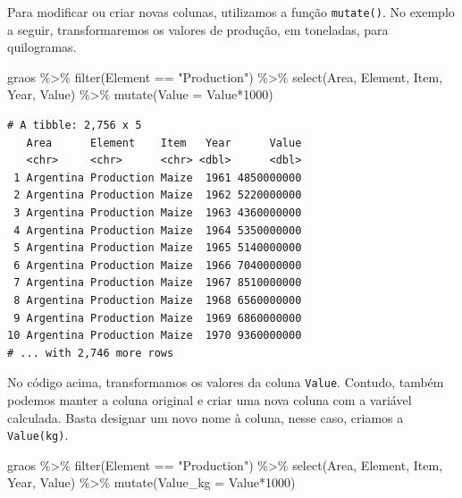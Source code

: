 \documentclass[
  brazilian,
]{book}
\newenvironment{Shaded}{\begin{snugshade}}{\end{snugshade}}
\newcommand{\AttributeTok}[1]{\textcolor[rgb]{0.77,0.63,0.00}{#1}}
\newcommand{\DecValTok}[1]{\textcolor[rgb]{0.00,0.00,0.81}{#1}}
\newcommand{\FunctionTok}[1]{\textcolor[rgb]{0.00,0.00,0.00}{#1}}
\newcommand{\NormalTok}[1]{#1}
\newcommand{\SpecialCharTok}[1]{\textcolor[rgb]{0.00,0.00,0.00}{#1}}
\newcommand{\StringTok}[1]{\textcolor[rgb]{0.31,0.60,0.02}{#1}}
\begin{document}
Para modificar ou criar novas colunas, utilizamos a função \texttt{mutate()}. No exemplo a seguir, transformaremos os valores de produção, em toneladas, para quilogramas.

\begin{Shaded}
\begin{Highlighting}[]
\NormalTok{graos }\SpecialCharTok{\%\textgreater{}\%} 
  \FunctionTok{filter}\NormalTok{(Element }\SpecialCharTok{==} \StringTok{"Production"}\NormalTok{) }\SpecialCharTok{\%\textgreater{}\%} 
  \FunctionTok{select}\NormalTok{(Area, Element, Item, Year, Value) }\SpecialCharTok{\%\textgreater{}\%} 
  \FunctionTok{mutate}\NormalTok{(}\AttributeTok{Value =}\NormalTok{ Value}\SpecialCharTok{*}\DecValTok{1000}\NormalTok{)}
\end{Highlighting}
\end{Shaded}

\begin{verbatim}
# A tibble: 2,756 x 5
   Area      Element    Item   Year      Value
   <chr>     <chr>      <chr> <dbl>      <dbl>
 1 Argentina Production Maize  1961 4850000000
 2 Argentina Production Maize  1962 5220000000
 3 Argentina Production Maize  1963 4360000000
 4 Argentina Production Maize  1964 5350000000
 5 Argentina Production Maize  1965 5140000000
 6 Argentina Production Maize  1966 7040000000
 7 Argentina Production Maize  1967 8510000000
 8 Argentina Production Maize  1968 6560000000
 9 Argentina Production Maize  1969 6860000000
10 Argentina Production Maize  1970 9360000000
# ... with 2,746 more rows
\end{verbatim}

No código acima, transformamos os valores da coluna \texttt{Value}. Contudo, também podemos manter a coluna original e criar uma nova coluna com a variável calculada. Basta designar um novo nome à coluna, nesse caso, criamos a \texttt{Value(kg)}.

\begin{Shaded}
\begin{Highlighting}[]
\NormalTok{graos }\SpecialCharTok{\%\textgreater{}\%} 
  \FunctionTok{filter}\NormalTok{(Element }\SpecialCharTok{==} \StringTok{"Production"}\NormalTok{) }\SpecialCharTok{\%\textgreater{}\%} 
  \FunctionTok{select}\NormalTok{(Area, Element, Item, Year, Value) }\SpecialCharTok{\%\textgreater{}\%} 
  \FunctionTok{mutate}\NormalTok{(}\AttributeTok{Value\_kg =}\NormalTok{ Value}\SpecialCharTok{*}\DecValTok{1000}\NormalTok{)}
\end{Highlighting}
\end{Shaded}
\end{document}
